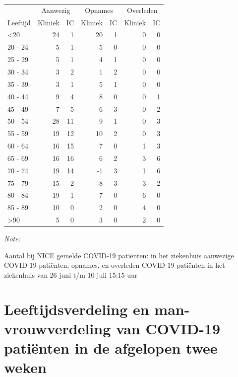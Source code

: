 \documentclass[
  english,
  man,floatsintext]{apa6}
\begin{document}
\begin{table}
\centering\begingroup\fontsize{10}{12}\selectfont

\begin{threeparttable}
\begin{tabular}{lrrrrrr}
\toprule
\multicolumn{1}{c}{ } & \multicolumn{2}{c}{Aanwezig} & \multicolumn{2}{c}{Opnames} & \multicolumn{2}{c}{Overleden} \\
\cmidrule(l{3pt}r{3pt}){2-3} \cmidrule(l{3pt}r{3pt}){4-5} \cmidrule(l{3pt}r{3pt}){6-7}
Leeftijd & Kliniek & IC & Kliniek & IC & Kliniek & IC\\
\midrule
<20 & 24 & 1 & 20 & 1 & 0 & 0\\
20 - 24 & 5 & 1 & 5 & 0 & 0 & 0\\
25 - 29 & 5 & 1 & 4 & 1 & 0 & 0\\
30 - 34 & 3 & 2 & 1 & 2 & 0 & 0\\
35 - 39 & 3 & 1 & 5 & 1 & 0 & 0\\
40 - 44 & 9 & 4 & 8 & 0 & 0 & 1\\
45 - 49 & 7 & 5 & 6 & 3 & 0 & 2\\
50 - 54 & 28 & 11 & 9 & 1 & 0 & 3\\
55 - 59 & 19 & 12 & 10 & 2 & 0 & 3\\
60 - 64 & 16 & 15 & 7 & 0 & 1 & 3\\
65 - 69 & 16 & 16 & 6 & 2 & 3 & 6\\
70 - 74 & 19 & 14 & -1 & 3 & 1 & 6\\
75 - 79 & 15 & 2 & -8 & 3 & 3 & 2\\
80 - 84 & 19 & 1 & 7 & 0 & 6 & 0\\
85 - 89 & 10 & 0 & 2 & 0 & 4 & 0\\
>90 & 5 & 0 & 3 & 0 & 2 & 0\\
\bottomrule
\end{tabular}
\begin{tablenotes}
\item \textit{Note: } 
\item Aantal bij NICE gemelde COVID-19 patiënten: in het ziekenhuis aanwezige COVID-19 patiënten, opnames, en overleden COVID-19 patiënten in het ziekenhuis van 26 juni t/m 10 juli 15:15 uur
\end{tablenotes}
\end{threeparttable}
\endgroup{}
\end{table}

\newpage

\hypertarget{leeftijdsverdeling-en-man-vrouwverdeling-van-covid-19-patiuxebnten-in-de-afgelopen-twee-weken}{%
\section{Leeftijdsverdeling en man-vrouwverdeling van COVID-19 patiënten in de afgelopen twee weken}\label{leeftijdsverdeling-en-man-vrouwverdeling-van-covid-19-patiuxebnten-in-de-afgelopen-twee-weken}}
\end{document}
